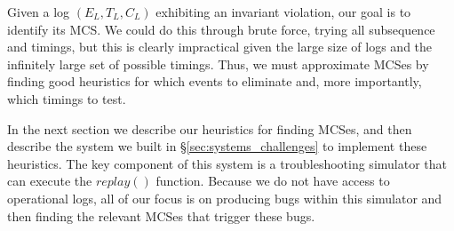Given a log $(E_L, T_L, C_L)$ exhibiting an invariant violation,
our goal is to identify its MCS. We could do this through brute force, trying
all subsequence and timings, but this is clearly impractical given the large size of logs and the
infinitely large set of possible timings. Thus, we must approximate MCSes by finding good heuristics
for which events to eliminate and, more importantly, which timings to test.

In the next section we describe our heuristics for finding MCSes, and then describe the system we built in \S\ref{sec:systems_challenges} to implement these heuristics. The key component of this system is a troubleshooting simulator that can execute the $replay()$ function. Because we do not have access to operational logs, all of our focus is on producing bugs within this simulator and then finding the relevant MCSes that trigger these bugs.
